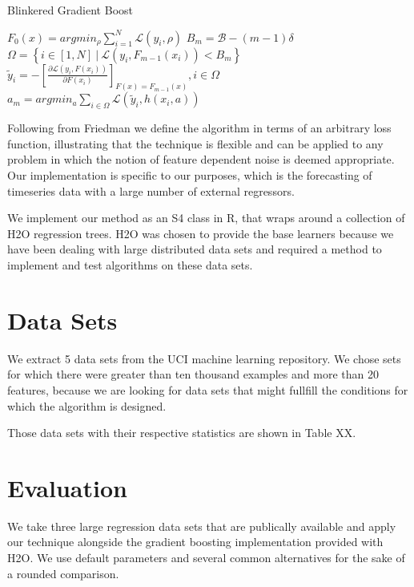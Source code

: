 \documentclass[11pt,twoside,a4paper]{article}
\begin{document}
\begin{algorithm}
\caption{Blinkered Gradient Boost}\label{bgm}
\begin{algorithmic}[1]
\State $\displaystyle F_0(x) = arg min_{\rho} \sum_{i=1}^N \mathcal{L}(y_i, \rho) $
\State $B_m = \mathcal{B} - (m-1)\delta $
\State $\displaystyle \Omega = \left\{ i \in [1,N] \ | \ \mathcal{L}(y_i, F_{m-1}(x_i)) < B_m \right\} $
\State $\displaystyle \tilde{y}_i = - \left[ \frac{\partial \mathcal{L}(y_i, F(x_i)) }{\partial  F(x_i)} \right]_{F(x) =F_{m-1}(x)}, i \in \Omega  $
\State $\displaystyle a_m = arg min_a \sum_{i \in \Omega} \mathcal{L}(\tilde{y}_i, h(x_i, a)) $
\EndFor
\end{algorithmic}
\end{algorithm}

 
Following from Friedman we define the algorithm in terms of an arbitrary loss function, illustrating
that the technique is flexible and can be applied to any problem in which the notion of feature dependent
noise is deemed appropriate. Our implementation is specific to our purposes, which is the forecasting
of timeseries data with a large number of external regressors.

We implement our method as an S4 class in R, that wraps around a collection of H2O regression trees.
H2O was chosen to provide the base learners because we have been dealing with large distributed data 
sets and required a method to implement and test algorithms on these data sets.

\section{Data Sets}

We extract 5 data sets from the UCI machine learning repository. We chose sets for which there were greater than ten thousand
examples and more than 20 features, because we are looking for data sets that might fullfill the conditions for which the
algorithm is designed. 

Those data sets with their respective statistics are shown in Table XX.

  

\section{Evaluation}

We take three large regression data sets that are publically available 
and apply our technique alongside the gradient boosting implementation
provided with H2O. We use default parameters and several common alternatives
for the sake of a rounded comparison. 
\end{document}

